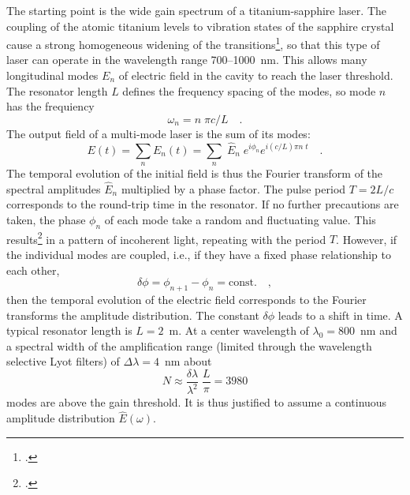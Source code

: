 The starting point is the  wide gain spectrum of a
titanium-sapphire laser. The coupling of the atomic titanium levels to
vibration states of the sapphire crystal cause a strong
homogeneous widening of the transitions\footcite[chapter 4]{Rulliere2005}, so that
this type of laser can operate in the wavelength range 700--1000~nm. This allows many longitudinal modes $E_n$  of
electric field in the cavity  to reach the laser threshold. The resonator length $L$ defines the frequency spacing of the
modes, so mode $n$ has the frequiency 
\begin{equation}
 \omega_n = n \; \pi c / L \quad.
\end{equation}
The output field of a multi-mode laser is the sum of its
modes:
\begin{equation}
  E(t) = \sum_n E_n(t) = \sum_n \; \hat{E}_n \; e^{i \phi_n} e^{i (c/L) \pi n \; t} \quad .
\end{equation}
The temporal evolution of the initial field is thus  the Fourier transform of the  spectral amplitudes $\hat{E}_n$ multiplied by a phase factor. The pulse period  $T = 2L /c$  corresponds to the round-trip  time in the resonator.
If no further precautions are taken, the
phase $\phi_n$ of each mode take a random  and fluctuating value. This
results\footcite{DielsRudolph1996} in a  pattern of incoherent light, repeating with the period $T$.
However, if the individual modes are coupled, i.e., if they 
have a fixed phase relationship to each other,
\begin{equation}
   \delta \phi = \phi_{n+1} - \phi_n = \text{const.} \quad,
   \label{gl_theo_nlo_ml_phiconst}
\end{equation}
then the temporal evolution of the electric field corresponds to the
Fourier transforms the amplitude distribution. The constant
$\delta \phi$ leads to a shift in  time. A typical resonator length is $L = 2$~m. At
a center wavelength of $\lambda_0 = 800$~nm and a
spectral width of the amplification range (limited through the
wavelength selective Lyot filters) of $\Delta \lambda =
4$~nm  about
\begin{equation}
 N \approx \frac{\delta \lambda}{ \lambda^2} \; \frac{L}{\pi} =
 3980
\end{equation}
modes are above the gain threshold. It is thus justified to assume  a
continuous amplitude distribution $\hat{E}(\omega)$.


